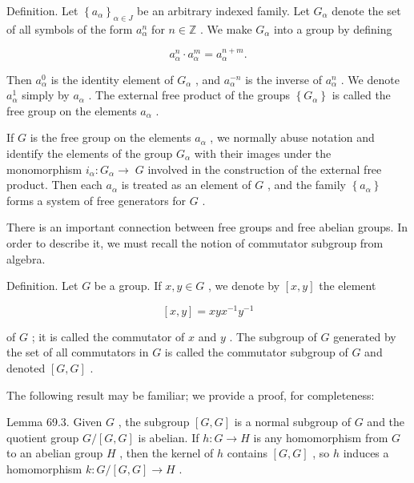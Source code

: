\documentclass[10pt]{article}
\begin{document}
Definition. Let \({\left\{  {a}_{\alpha }\right\}  }_{\alpha  \in  J}\) be an arbitrary indexed family. Let \({G}_{\alpha }\) denote the set of all symbols of the form \({a}_{\alpha }^{n}\) for \(n \in  \mathbb{Z}\) . We make \({G}_{\alpha }\) into a group by defining

\[
{a}_{\alpha }^{n} \cdot  {a}_{\alpha }^{m} = {a}_{\alpha }^{n + m}.
\]

Then \({a}_{\alpha }^{0}\) is the identity element of \({G}_{\alpha }\) , and \({a}_{\alpha }^{-n}\) is the inverse of \({a}_{\alpha }^{n}\) . We denote \({a}_{\alpha }^{1}\) simply by \({a}_{\alpha }\) . The external free product of the groups \(\left\{  {G}_{\alpha }\right\}\) is called the free group on the elements \({a}_{\alpha }\) .

If \(G\) is the free group on the elements \({a}_{\alpha }\) , we normally abuse notation and identify the elements of the group \({G}_{\alpha }\) with their images under the monomorphism \({i}_{\alpha } : {G}_{\alpha } \rightarrow \; G\) involved in the construction of the external free product. Then each \({a}_{\alpha }\) is treated as an element of \(G\) , and the family \(\left\{  {a}_{\alpha }\right\}\) forms a system of free generators for \(G\) .

There is an important connection between free groups and free abelian groups. In order to describe it, we must recall the notion of commutator subgroup from algebra.

Definition. Let \(G\) be a group. If \(x,y \in  G\) , we denote by \(\left\lbrack  {x,y}\right\rbrack\) the element

\[
\left\lbrack  {x,y}\right\rbrack   = {xy}{x}^{-1}{y}^{-1}
\]

of \(G\) ; it is called the commutator of \(x\) and \(y\) . The subgroup of \(G\) generated by the set of all commutators in \(G\) is called the commutator subgroup of \(G\) and denoted \(\left\lbrack  {G,G}\right\rbrack\) .

The following result may be familiar; we provide a proof, for completeness:

Lemma 69.3. Given \(G\) , the subgroup \(\left\lbrack  {G,G}\right\rbrack\) is a normal subgroup of \(G\) and the quotient group \(G/\left\lbrack  {G,G}\right\rbrack\) is abelian. If \(h : G \rightarrow  H\) is any homomorphism from \(G\) to an abelian group \(H\) , then the kernel of \(h\) contains \(\left\lbrack  {G,G}\right\rbrack\) , so \(h\) induces a homomorphism \(k : G/\left\lbrack  {G,G}\right\rbrack   \rightarrow  H\) .
\end{document}
